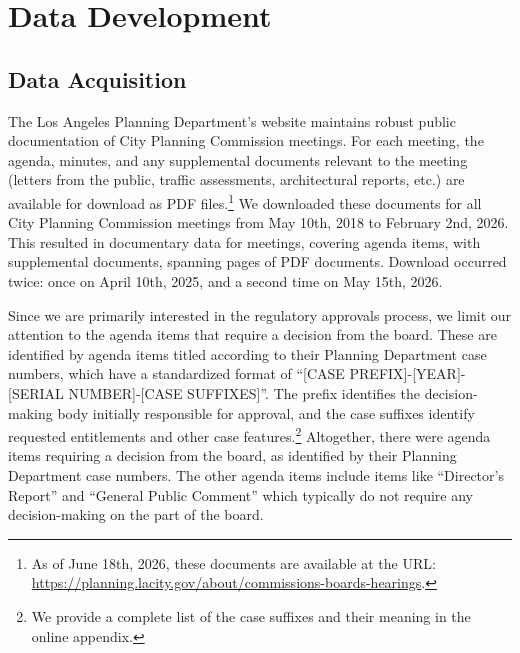 \section{Data Development}\label{sec_data}

\subsection{Data Acquisition}

The Los Angeles Planning Department's website maintains robust public documentation of City Planning Commission meetings. For each meeting, the agenda, minutes, and any supplemental documents relevant to the meeting (letters from the public, traffic assessments, architectural reports, etc.) are available for download as PDF files.\footnote{As of June 18th, 2026, these documents are available at the URL: \url{https://planning.lacity.gov/about/commissions-boards-hearings}.} We downloaded these documents for all City Planning Commission meetings from May 10th, 2018 to February 2nd, 2026. This resulted in documentary data for  meetings, covering  agenda items, with  supplemental documents, spanning  pages of PDF documents. Download occurred twice: once on April 10th, 2025, and a second time on May 15th, 2026.

Since we are primarily interested in the regulatory approvals process, we limit our attention to the agenda items that require a decision from the board. These are identified by agenda items titled according to their Planning Department case numbers, which have a standardized format of ``[CASE PREFIX]-[YEAR]-[SERIAL NUMBER]-[CASE SUFFIXES]''. The prefix identifies the decision-making body initially responsible for approval, and the case suffixes identify requested entitlements and other case features.\footnote{We provide a complete list of the case suffixes and their meaning in the online appendix.} Altogether, there were  agenda items requiring a decision from the board, as identified by their Planning Department case numbers. The other agenda items include items like ``Director's Report'' and ``General Public Comment'' which typically do not require any decision-making on the part of the board.

